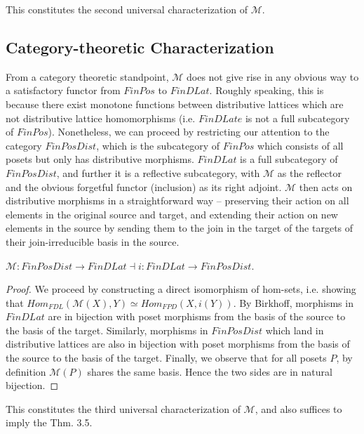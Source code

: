 \documentclass[hoptionsi,review,format=sigplan]{acmart}
\theoremstyle{definition}
\newcommand{\Mcc}{\mathcal{M}}
\begin{document}
This constitutes the second universal characterization of \(\Mcc\).

\subsection{Category-theoretic Characterization}

From a category theoretic standpoint, \(\Mcc\) does not give rise in any obvious way to a satisfactory functor from \(FinPos\) to \(FinDLat\). Roughly speaking, this is because there exist monotone functions between distributive lattices which are not distributive lattice homomorphisms (i.e. \(FinDLate\) is not a full subcategory of \(FinPos\)). Nonetheless, we can proceed by restricting our attention to the category \(FinPosDist\), which is the subcategory of \(FinPos\) which consists of all posets but only has distributive morphisms. \(FinDLat\) is a full subcategory of \(FinPosDist\), and further it is a reflective subcategory, with \(\Mcc\) as the reflector and the obvious forgetful functor (inclusion) as its right adjoint. \(\Mcc\) then acts on distributive morphisms in a straightforward way -- preserving their action on all elements in the original source and target, and extending their action on new elements in the source by sending them to the join in the target of the targets of their join-irreducible basis in the source.

\begin{theorem}
\(\Mcc : FinPosDist \rightarrow FinDLat \allowbreak  \dashv \allowbreak i : FinDLat \rightarrow FinPosDist\).
\end{theorem}

\begin{proof}
We proceed by constructing a direct isomorphism of hom-sets, i.e. showing that \(Hom_{FDL}(\Mcc(X),Y) \allowbreak \simeq \allowbreak Hom_{FPD}(X,i(Y))\). By Birkhoff, morphisms in \(FinDLat\) are in bijection with poset morphisms from the basis of the source to the basis of the target. Similarly, morphisms in \(FinPosDist\) which land in distributive lattices are also in bijection with poset morphisms from the basis of the source to the basis of the target. Finally, we observe that for all posets \(P\), by definition \(\Mcc(P)\) shares the same basis. Hence the two sides are in natural bijection.
\end{proof}
This constitutes the third universal characterization of \(\Mcc\), and also suffices to imply the Thm. 3.5. 

\end{document}

